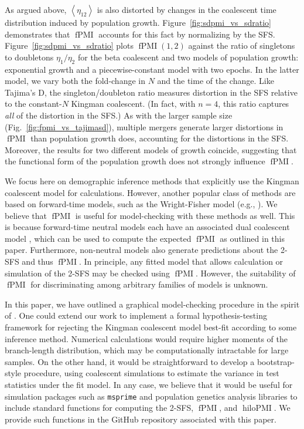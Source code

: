 \documentclass[11pt, letterpaper]{article}   	%
\newcommand{\fig}[1]{Fig.~\ref{#1}}
\newcommand{\Fig}[1]{Figure~\ref{#1}}
\newcommand{\E}[1]{\left< #1 \right>}
\DeclareMathOperator{\fpmi}{fPMI}
\DeclareMathOperator{\hilopmi}{hiloPMI}
\begin{document}
As argued above, $\E{\eta_{12}}$ is also distorted by changes in the coalescent time distribution induced by population growth.
\Fig{fig:sdpmi_vs_sdratio} demonstrates that $\fpmi$ accounts for this fact by normalizing by the SFS.
\Fig{fig:sdpmi_vs_sdratio} plots $\fpmi(1,2)$ against the ratio of singletons to doubletons $\eta_1 / \eta_2$ for the beta coalescent and two models of population growth: exponential growth and a piecewise-constant model with two epochs.
In the latter model, we vary both the fold-change in $N$ and the time of the change.
Like Tajima's D, the singleton/doubleton ratio measures distortion in the SFS relative to the constant-$N$ Kingman coalescent.
(In fact, with $n=4$, this ratio captures \emph{all} of the distortion in the SFS.)
As with the larger sample size (\fig{fig:fpmi_vs_tajimasd}), multiple mergers generate larger distortions in $\fpmi$ than population growth does, accounting for the distortions in the SFS.
Moreover, the results for two different models of growth coincide, suggesting that the functional form of the population growth does not strongly influence $\fpmi$.

We focus here on demographic inference methods that explicitly use the Kingman coalescent model for calculations.
However, another popular class of methods are based on forward-time models, such as the Wright-Fisher model (e.g., \cite{GutenkunstEtAl2009, SheehanEtAl2013}).
We believe that $\fpmi$ is useful for model-checking with these methods as well.
This is because forward-time neutral models each have an associated dual coalescent model \autocite{Etheridge2011e}, which can be used to compute the expected $\fpmi$ as outlined in this paper.
Furthermore, non-neutral models also generate predictions about the 2-SFS and thus $\fpmi$.
In principle, any fitted model that allows calculation or simulation of the 2-SFS may be checked using $\fpmi$.
However, the suitability of $\fpmi$ for discriminating among arbitrary families of models is unknown.

In this paper, we have outlined a graphical model-checking procedure in the spirit of \textcite{Anscombe1973}.
One could extend our work to implement a formal hypothesis-testing framework for rejecting the Kingman coalescent model best-fit according to some inference method.
Numerical calculations would require higher moments of the branch-length distribution, which may be computationally intractable for large samples.
On the other hand, it would be straightforward to develop a bootstrap-style procedure, using coalescent simulations to estimate the variance in test statistics under the fit model.
In any case, we believe that it would be useful for simulation packages such as \texttt{msprime} and population genetics analysis libraries to include standard functions for computing the 2-SFS, $\fpmi$, and $\hilopmi$.
We provide such functions in the GitHub repository associated with this paper.
\end{document}
